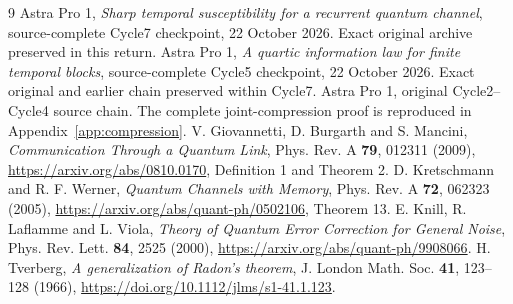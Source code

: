 \documentclass[11pt]{article}
\begin{document}

\appendix


\begingroup\small
\begin{thebibliography}{9}
\setlength{\itemsep}{2pt}\setlength{\parskip}{0pt}
 Astra Pro 1, \emph{Sharp temporal susceptibility for a
recurrent quantum channel}, source-complete Cycle7 checkpoint,
22 October 2026. Exact original archive preserved in this return.
 Astra Pro 1, \emph{A quartic information law for finite
temporal blocks}, source-complete Cycle5 checkpoint, 22 October 2026.
Exact original and earlier chain preserved within Cycle7.
 Astra Pro 1, original Cycle2--Cycle4 source chain.
The complete joint-compression proof is reproduced in
Appendix~\ref{app:compression}.
 V. Giovannetti, D. Burgarth and S. Mancini,
\emph{Communication Through a Quantum Link}, Phys. Rev. A \textbf{79},
012311 (2009), \url{https://arxiv.org/abs/0810.0170},
Definition 1 and Theorem 2.
 D. Kretschmann and R. F. Werner,
\emph{Quantum Channels with Memory}, Phys. Rev. A \textbf{72},
062323 (2005), \url{https://arxiv.org/abs/quant-ph/0502106}, Theorem 13.
 E. Knill, R. Laflamme and L. Viola,
\emph{Theory of Quantum Error Correction for General Noise},
Phys. Rev. Lett. \textbf{84}, 2525 (2000),
\url{https://arxiv.org/abs/quant-ph/9908066}.
 H. Tverberg, \emph{A generalization of Radon's theorem},
J. London Math. Soc. \textbf{41}, 123--128 (1966),
\url{https://doi.org/10.1112/jlms/s1-41.1.123}.
\end{thebibliography}
\endgroup
\end{document}
